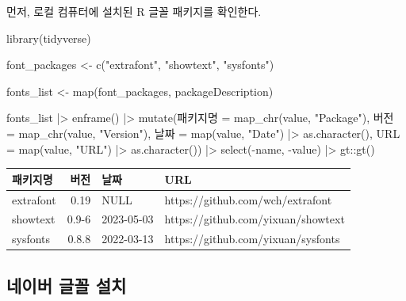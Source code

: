 \documentclass[
  letterpaper,
]{book}
\newenvironment{Shaded}{\begin{snugshade}}{\end{snugshade}}
\newcommand{\AttributeTok}[1]{\textcolor[rgb]{0.40,0.45,0.13}{#1}}
\newcommand{\FunctionTok}[1]{\textcolor[rgb]{0.28,0.35,0.67}{#1}}
\newcommand{\NormalTok}[1]{\textcolor[rgb]{0.00,0.23,0.31}{#1}}
\newcommand{\OtherTok}[1]{\textcolor[rgb]{0.00,0.23,0.31}{#1}}
\newcommand{\SpecialCharTok}[1]{\textcolor[rgb]{0.37,0.37,0.37}{#1}}
\newcommand{\StringTok}[1]{\textcolor[rgb]{0.13,0.47,0.30}{#1}}
\begin{document}
먼저, 로컬 컴퓨터에 설치된 R 글꼴 패키지를 확인한다.

\begin{Shaded}
\begin{Highlighting}[]
\FunctionTok{library}\NormalTok{(tidyverse)}

\NormalTok{font\_packages }\OtherTok{\textless{}{-}} \FunctionTok{c}\NormalTok{(}\StringTok{"extrafont"}\NormalTok{, }\StringTok{"showtext"}\NormalTok{, }\StringTok{"sysfonts"}\NormalTok{)}

\NormalTok{fonts\_list }\OtherTok{\textless{}{-}} \FunctionTok{map}\NormalTok{(font\_packages, packageDescription)}

\NormalTok{fonts\_list }\SpecialCharTok{|\textgreater{}} 
  \FunctionTok{enframe}\NormalTok{() }\SpecialCharTok{|\textgreater{}} 
  \FunctionTok{mutate}\NormalTok{(패키지명 }\OtherTok{=} \FunctionTok{map\_chr}\NormalTok{(value, }\StringTok{"Package"}\NormalTok{),}
\NormalTok{         버전 }\OtherTok{=} \FunctionTok{map\_chr}\NormalTok{(value, }\StringTok{"Version"}\NormalTok{),}
\NormalTok{         날짜 }\OtherTok{=} \FunctionTok{map}\NormalTok{(value, }\StringTok{"Date"}\NormalTok{) }\SpecialCharTok{|\textgreater{}} \FunctionTok{as.character}\NormalTok{(),}
         \AttributeTok{URL =} \FunctionTok{map}\NormalTok{(value, }\StringTok{"URL"}\NormalTok{) }\SpecialCharTok{|\textgreater{}} \FunctionTok{as.character}\NormalTok{()) }\SpecialCharTok{|\textgreater{}} 
  \FunctionTok{select}\NormalTok{(}\SpecialCharTok{{-}}\NormalTok{name, }\SpecialCharTok{{-}}\NormalTok{value) }\SpecialCharTok{|\textgreater{}} 
\NormalTok{  gt}\SpecialCharTok{::}\FunctionTok{gt}\NormalTok{()}
\end{Highlighting}
\end{Shaded}

\begin{longtable*}{lrll}
\toprule
패키지명 & 버전 & 날짜 & URL \\ 
\midrule
extrafont & 0.19 & NULL & https://github.com/wch/extrafont \\ 
showtext & 0.9-6 & 2023-05-03 & https://github.com/yixuan/showtext \\ 
sysfonts & 0.8.8 & 2022-03-13 & https://github.com/yixuan/sysfonts \\ 
\bottomrule
\end{longtable*}

\hypertarget{uxb124uxc774uxbc84-uxae00uxaf34-uxc124uxce58}{%
\subsection{네이버 글꼴
설치}\label{uxb124uxc774uxbc84-uxae00uxaf34-uxc124uxce58}}
\end{document}
